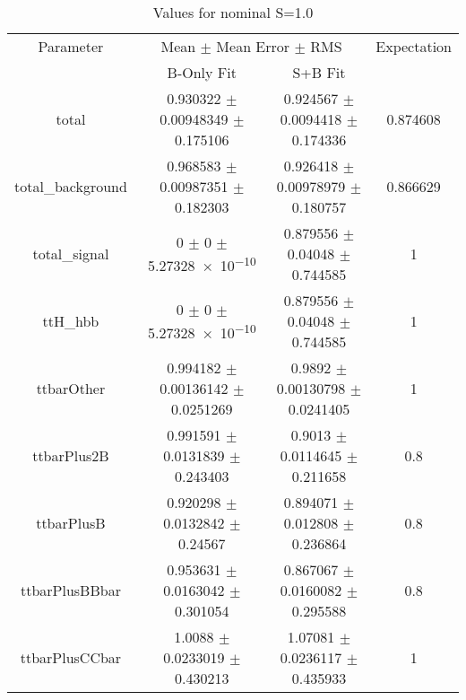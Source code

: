 \begin{table}
\centering
\caption{Values for nominal S=1.0}
\begin{tabular}{cccc}
\toprule
Parameter & \multicolumn{2}{c}{Mean $\pm$ Mean Error $\pm$ RMS} & Expectation\\
 & B-Only Fit & S+B Fit & \\
\midrule
total & \num{0.930322} $\pm$ \num{0.00948349} $\pm$ \num{0.175106} & \num{0.924567} $\pm$ \num{0.0094418} $\pm$ \num{0.174336} & \num{0.874608}\\
total\_background & \num{0.968583} $\pm$ \num{0.00987351} $\pm$ \num{0.182303} & \num{0.926418} $\pm$ \num{0.00978979} $\pm$ \num{0.180757} & \num{0.866629}\\
total\_signal & \num{0} $\pm$ \num{0} $\pm$ \num{5.27328e-10} & \num{0.879556} $\pm$ \num{0.04048} $\pm$ \num{0.744585} & \num{1}\\
ttH\_hbb & \num{0} $\pm$ \num{0} $\pm$ \num{5.27328e-10} & \num{0.879556} $\pm$ \num{0.04048} $\pm$ \num{0.744585} & \num{1}\\
ttbarOther & \num{0.994182} $\pm$ \num{0.00136142} $\pm$ \num{0.0251269} & \num{0.9892} $\pm$ \num{0.00130798} $\pm$ \num{0.0241405} & \num{1}\\
ttbarPlus2B & \num{0.991591} $\pm$ \num{0.0131839} $\pm$ \num{0.243403} & \num{0.9013} $\pm$ \num{0.0114645} $\pm$ \num{0.211658} & \num{0.8}\\
ttbarPlusB & \num{0.920298} $\pm$ \num{0.0132842} $\pm$ \num{0.24567} & \num{0.894071} $\pm$ \num{0.012808} $\pm$ \num{0.236864} & \num{0.8}\\
ttbarPlusBBbar & \num{0.953631} $\pm$ \num{0.0163042} $\pm$ \num{0.301054} & \num{0.867067} $\pm$ \num{0.0160082} $\pm$ \num{0.295588} & \num{0.8}\\
ttbarPlusCCbar & \num{1.0088} $\pm$ \num{0.0233019} $\pm$ \num{0.430213} & \num{1.07081} $\pm$ \num{0.0236117} $\pm$ \num{0.435933} & \num{1}\\
\bottomrule
\end{tabular}
\end{table}